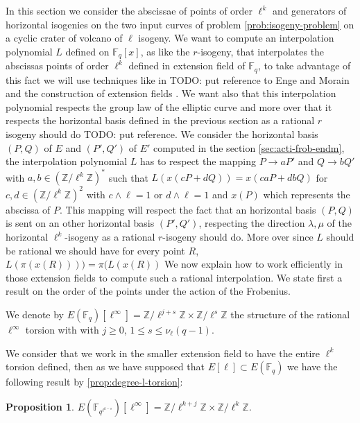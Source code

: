 \documentclass{lms}
\newcommand{\todo}[1]{{\color{red}TODO: #1}}
\newtheorem{prop}[thm]{Proposition}
\begin{document}
In this section we consider the abscissae of points of order $\ell^k$ and generators of horizontal isogenies on the two input curves of problem \ref{prob:isogeny-problem} on a cyclic crater of volcano of $\ell$ isogeny. We want to compute an interpolation polynomial $L$ defined on $\mathbb{F}_q[x]$, as like the $r$-isogeny, that interpolates the abscissas points of order $\ell^k$ defined in extension field of $\mathbb{F}_q$, to take advantage of this fact we will use techniques like in \todo{put reference to Enge and Morain} and the construction of extension fields \cite{DoSc12} \cite{DeDoSc13} . We want also that this interpolation polynomial respects the group law of the elliptic curve and more over that it respects the horizontal basis defined in the previous section as a rational $r$ isogeny should do \todo{put reference}.
\newline
 We consider the horizontal basis $(P,Q)$ of $E$ and $(P',Q')$ of $E'$ computed in the section \ref{sec:acti-frob-endm}, the interpolation polynomial $L$ has to respect the mapping $P \rightarrow aP'$ and $Q \rightarrow bQ'$ with $a,b \in \left(\mathbb{Z}/\ell^k \mathbb{Z} \right)^*$ such that $L(x(cP+dQ))=x(caP+dbQ)$ for $c,d \in (\mathbb{Z}/\ell^k\mathbb{Z})^2$ with $c\wedge \ell=1$ or $d \wedge \ell =1$ and $x(P)$ which represents the abscissa of $P$. This mapping will respect the fact that an horizontal basis $(P,Q)$ is sent on an other horizontal basis $(P',Q')$, respecting the direction $\lambda, \mu$ of the horizontal $\ell^k$-isogeny as a rational $r$-isogeny should do. More over since $L$ should be rational we should have for every point $R$, $L(\pi(x(R))))=\pi(L(x(R))$ 
\newline
We now explain how to work efficiently in those extension fields to compute such a rational interpolation. 
We state first a result on the order of the points under the action of the Frobenius.

\begin{defi}
We denote by $E(\mathbb{F}_q)[\ell^{\infty}]=\mathbb{Z}/\ell^{j+s}
\mathbb{Z} \times \mathbb{Z}/\ell^{s} \mathbb{Z}$ the structure of the rational $\ell^{\infty}$ torsion with with $j \geqslant 0$, $1 \leqslant s \leqslant \nu_\ell(q-1)$. 
\end{defi}
We consider that we work in the smaller extension field to have the entire $\ell^k$ torsion defined, then as we have supposed that $E[\ell] \subset E(\mathbb{F}_q)$ we have the following result by \ref{prop:degree-l-torsion}:

\begin{prop}
 $E(\mathbb{F}_{q^{\ell^{k-s}}})[\ell^{\infty}]=\mathbb{Z}/\ell^{k+j}
\mathbb{Z} \times \mathbb{Z}/\ell^{k} \mathbb{Z}$. 
\end{prop}
\end{document}
